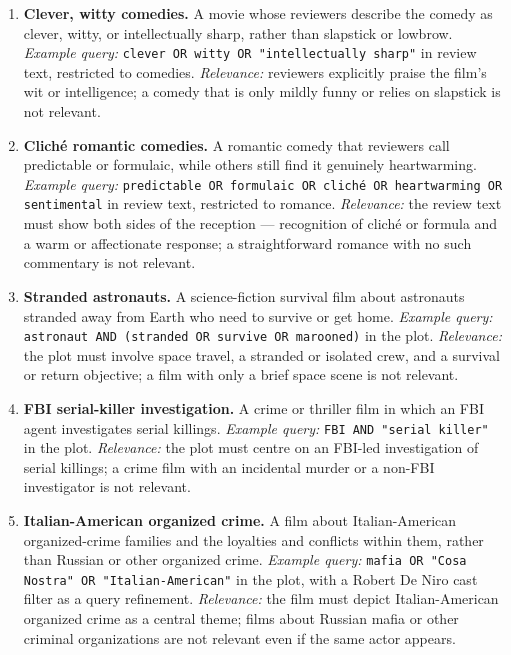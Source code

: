\documentclass[sigconf]{acmart}
\begin{document}
\begin{enumerate}
  \item \textbf{Clever, witty comedies.} A movie whose reviewers describe the comedy as
    clever, witty, or intellectually sharp, rather than slapstick or lowbrow.
    \emph{Example query:} \texttt{clever OR witty OR "intellectually sharp"} in review
    text, restricted to comedies. \emph{Relevance:} reviewers explicitly praise the
    film's wit or intelligence; a comedy that is only mildly funny or relies on
    slapstick is not relevant.
  \item \textbf{Cliché romantic comedies.} A romantic comedy that reviewers call
    predictable or formulaic, while others still find it genuinely heartwarming.
    \emph{Example query:} \texttt{predictable OR formulaic OR cliché OR heartwarming OR
    sentimental} in review text, restricted to romance. \emph{Relevance:} the review
    text must show both sides of the reception --- recognition of cliché or formula and
    a warm or affectionate response; a straightforward romance with no such commentary
    is not relevant.
  \item \textbf{Stranded astronauts.} A science-fiction survival film about astronauts
    stranded away from Earth who need to survive or get home. \emph{Example query:}
    \texttt{astronaut AND (stranded OR survive OR marooned)} in the plot.
    \emph{Relevance:} the plot must involve space travel, a stranded or isolated crew,
    and a survival or return objective; a film with only a brief space scene is not
    relevant.
  \item \textbf{FBI serial-killer investigation.} A crime or thriller film in which an
    FBI agent investigates serial killings. \emph{Example query:} \texttt{FBI AND
    "serial killer"} in the plot. \emph{Relevance:} the plot must centre on an FBI-led
    investigation of serial killings; a crime film with an incidental murder or a
    non-FBI investigator is not relevant.
  \item \textbf{Italian-American organized crime.} A film about Italian-American
    organized-crime families and the loyalties and conflicts within them, rather than
    Russian or other organized crime. \emph{Example query:} \texttt{mafia OR "Cosa
    Nostra" OR "Italian-American"} in the plot, with a Robert De Niro cast filter as a
    query refinement. \emph{Relevance:} the film must depict Italian-American organized
    crime as a central theme; films about Russian mafia or other criminal organizations
    are not relevant even if the same actor appears.
\end{enumerate}
\end{document}

